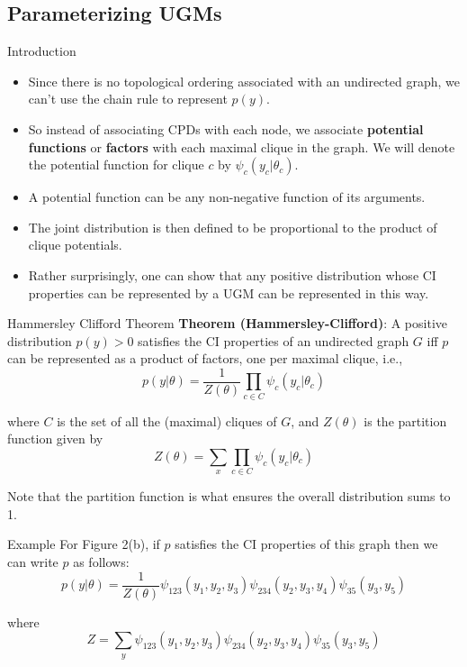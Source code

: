 \documentclass[10pt,mathserif]{beamer}
\begin{document}
         
\subsection{Parameterizing UGMs}
\begin{frame}{Introduction}
\begin{itemize}
    \item Since there is no topological ordering associated with an undirected graph, we can't use the chain rule to represent $p(y)$.
    \item So instead of associating CPDs with each node, we associate \textbf{potential functions} or \textbf{factors} with each maximal clique in the graph. We will denote the potential function for clique $c$ by $\psi_c(y_c|\theta_c)$.
    \item A potential function can be any non-negative function of its arguments.
    \item The joint distribution is then defined to be proportional to the product of clique potentials.
    \item Rather surprisingly, one can show that any positive distribution whose CI properties can be represented by a UGM can be represented in this way.
\end{itemize}
\end{frame}

\begin{frame}{Hammersley Clifford Theorem}
\textbf{Theorem (Hammersley-Clifford)}: A positive distribution $p(y) > 0$ satisfies the CI properties of an undirected graph $G$ iff $p$ can be represented as a product of factors, one per maximal clique, i.e.,
\begin{equation}
    p(y|\theta) = \frac{1}{Z(\theta)}\prod_{c\in C}\psi_c(y_c|\theta_c)
\end{equation}

where $C$ is the set of all the (maximal) cliques of $G$, and $Z(\theta)$ is the partition function given by
\begin{equation}
    Z(\theta) = \sum_x \prod_{c\in C}\psi_c(y_c|\theta_c)
\end{equation}

Note that the partition function is what ensures the overall distribution sums to 1.
\end{frame}

\begin{frame}{Example}
For Figure 2(b), if $p$ satisfies the CI properties of this graph then we can write $p$ as follows:
\begin{equation}
    p(y|\theta) = \frac{1}{Z(\theta)} \psi_{123}(y_1, y_2, y_3)\psi_{234}(y_2, y_3, y_4)\psi_{35}(y_3, y_5)
\end{equation}

where
\begin{equation}
    Z =  \sum_y\psi_{123}(y_1, y_2, y_3)\psi_{234}(y_2, y_3, y_4)\psi_{35}(y_3, y_5)
\end{equation}
\end{frame}
\end{document}
